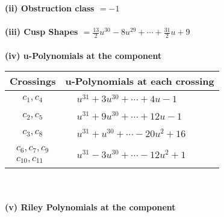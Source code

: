 \documentclass[1p]{elsarticle_modified}
\theoremstyle{definition}
\begin{document}
\flushleft \textbf{(ii) Obstruction class $= -1$}\\~\\
\flushleft \textbf{(iii) Cusp Shapes $= \frac{13}{2} u^{30}-8 u^{29}+\cdots+\frac{31}{2} u+9$}\\~\\
\newpage\renewcommand{\arraystretch}{1}
\flushleft \textbf{(iv) u-Polynomials at the component}\newline \\
\begin{tabular}{m{50pt}|m{274pt}}
Crossings & \hspace{64pt}u-Polynomials at each crossing \\
\hline $$\begin{aligned}c_{1},c_{4}\end{aligned}$$&$\begin{aligned}
&u^{31}+3 u^{30}+\cdots+4 u-1
\end{aligned}$\\
\hline $$\begin{aligned}c_{2},c_{5}\end{aligned}$$&$\begin{aligned}
&u^{31}+9 u^{30}+\cdots+12 u-1
\end{aligned}$\\
\hline $$\begin{aligned}c_{3},c_{8}\end{aligned}$$&$\begin{aligned}
&u^{31}+u^{30}+\cdots-20 u^2+16
\end{aligned}$\\
\hline $$\begin{aligned}c_{6},c_{7},c_{9}\\c_{10},c_{11}\end{aligned}$$&$\begin{aligned}
&u^{31}-3 u^{30}+\cdots-12 u^2+1
\end{aligned}$\\
\hline
\end{tabular}\\~\\
\newpage\renewcommand{\arraystretch}{1}
\flushleft \textbf{(v) Riley Polynomials at the component}\newline \\
\end{document}
